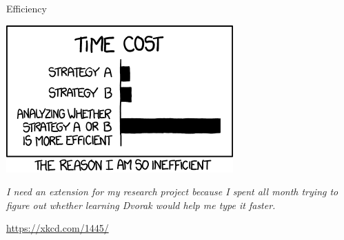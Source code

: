 
\begin{frame}[t,plain]
\titlepage
\end{frame}


\begin{frame}{Efficiency}
%
\begin{center}
	\includegraphics[width=.4\linewidth]{./gfx/02-xkcd-efficiency}\\
	\vspace{6pt}
	
	\scriptsize
	\emph{I need an extension for my research project because I spent all month trying to figure out whether learning Dvorak would help me type it faster.}

	\vspace{6pt}
	\url{https://xkcd.com/1445/}
\end{center}
%
\end{frame}


